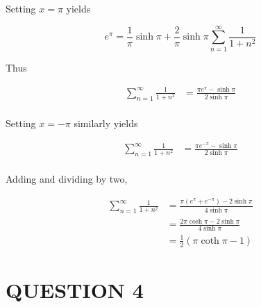 \documentclass[a4paper]{article}
\begin{document}
Setting $ x = \pi $ yields

\[ e^{\pi} = \frac{1}{\pi} \sinh \pi + \frac{2}{\pi} \sinh \pi \sum_{n=1}^{\infty} \frac{1}{1+n^{2}} \]

Thus

\begin{align*}
\sum_{n=1}^{\infty} \frac{1}{1+n^{2}} & = \frac{\pi e^{\pi} - \sinh \pi }{2 \sinh \pi} \\
\end{align*}

Setting $ x = -\pi $ similarly yields

\begin{align*}
\sum_{n=1}^{\infty} \frac{1}{1+n^{2}} & = \frac{\pi e^{-\pi} - \sinh \pi }{2 \sinh \pi} \\
\end{align*}

Adding and dividing by two, 

\begin{align*}
\sum_{n=1}^{\infty} \frac{1}{1+n^{2}} & = \frac{\pi (e^{\pi} + e^{-\pi}) - 2 \sinh \pi }{4 \sinh \pi} \\
& = \frac{2 \pi \cosh \pi  - 2 \sinh \pi }{4 \sinh \pi} \\
& = \frac{1}{2} ( \pi \coth \pi - 1)
\end{align*}

\section{QUESTION 4}
\end{document}
